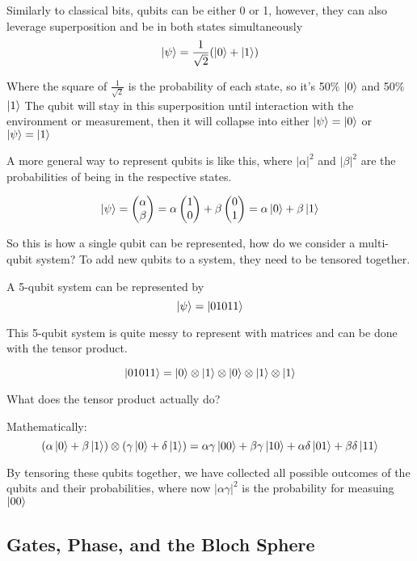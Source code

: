 \documentclass[12pt]{article}
\begin{document}
Similarly to classical bits, qubits can be either 0 or 1, however, they can also leverage superposition and be in both states simultaneously
$$
\ket{\psi} = \frac{1}{\sqrt{2}} (\ket{0} + \ket{1})
$$

Where the square of $\frac{1}{\sqrt{2}}$ is the probability of each state, so it's 50\% $\ket{0}$ and 50\% $\ket{1}$ The qubit will stay in this superposition until interaction with the environment or measurement, then it will collapse into either $\ket{\psi} = \ket{0}$ or $\ket{\psi} =\ket{1}$

A more general way to represent qubits is like this, where $|\alpha|^2$ and $|\beta|^2$ are the probabilities of being in the respective states.

$$
\ket{\psi} = 
\begin{pmatrix}
    \alpha \\
    \beta
\end{pmatrix} = 
\alpha \begin{pmatrix} 1 \\ 0 \end{pmatrix} + 
\beta \begin{pmatrix} 0 \\ 1 \end{pmatrix} =
\alpha\ket{0} + \beta\ket{1}
$$

So this is how a single qubit can be represented, how do we consider a multi-qubit system? To add new qubits to a system, they need to be tensored together.

A 5-qubit system can be represented by
$$
\ket{\psi} = \ket{01011}
$$

This 5-qubit system is quite messy to represent with matrices and can be done with the tensor product.

$$
\ket{01011} = \ket{0} \otimes \ket{1} \otimes \ket{0} \otimes \ket{1} \otimes \ket{1}
$$

What does the tensor product actually do?

Mathematically:
$$
(\alpha\ket{0} + \beta\ket{1}) \otimes (\gamma\ket{0} + \delta\ket{1}) = \alpha \gamma \ket{00} + \beta \gamma \ket{10} + \alpha \delta \ket{01} +\beta \delta \ket{11}
$$

By tensoring these qubits together, we have collected all possible outcomes of the qubits and their probabilities, where now $|\alpha \gamma|^2$ is the probability for measuing $\ket{00}$

\subsection{Gates, Phase, and the Bloch Sphere}
\end{document}
